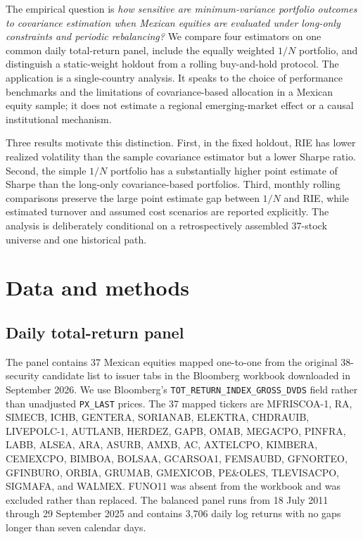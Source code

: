 \documentclass[11pt]{article}
\begin{document}
The empirical question is \emph{how sensitive are minimum-variance portfolio
outcomes to covariance estimation when Mexican equities are evaluated under
long-only constraints and periodic rebalancing?} We compare four estimators
on one common daily total-return panel, include the equally weighted $1/N$
portfolio, and distinguish a static-weight holdout from a rolling
buy-and-hold protocol. The application is a single-country analysis. It
speaks to the choice of performance benchmarks and the limitations of
covariance-based allocation in a Mexican equity sample; it does not estimate
a regional emerging-market effect or a causal institutional mechanism.

Three results motivate this distinction. First, in the fixed holdout, RIE
has lower realized volatility than the sample covariance estimator but a
lower Sharpe ratio. Second, the simple $1/N$ portfolio has a substantially
higher point estimate of Sharpe than the long-only covariance-based
portfolios. Third, monthly rolling comparisons preserve the large point
estimate gap between $1/N$ and RIE, while estimated turnover and assumed
cost scenarios are reported explicitly. The analysis is deliberately
conditional on a retrospectively assembled 37-stock universe and one
historical path.

\section{Data and methods}

\subsection{Daily total-return panel}

The panel contains 37 Mexican equities mapped one-to-one from the original
38-security candidate list to issuer tabs in the Bloomberg workbook
downloaded in September 2026. We use Bloomberg's
\texttt{TOT\_RETURN\_INDEX\_GROSS\_DVDS} field rather than unadjusted
\texttt{PX\_LAST} prices. The 37 mapped tickers are MFRISCOA-1, RA, SIMECB,
ICHB, GENTERA, SORIANAB, ELEKTRA, CHDRAUIB, LIVEPOLC-1, AUTLANB, HERDEZ,
GAPB, OMAB, MEGACPO, PINFRA, LABB, ALSEA, ARA, ASURB, AMXB, AC, AXTELCPO,
KIMBERA, CEMEXCPO, BIMBOA, BOLSAA, GCARSOA1, FEMSAUBD, GFNORTEO, GFINBURO,
ORBIA, GRUMAB, GMEXICOB, PE\&OLES, TLEVISACPO, SIGMAFA, and WALMEX. FUNO11
was absent from the workbook and was excluded rather than replaced. The
balanced panel runs from 18 July 2011 through 29 September 2025 and contains
3,706 daily log returns with no gaps longer than seven calendar days.
\end{document}
